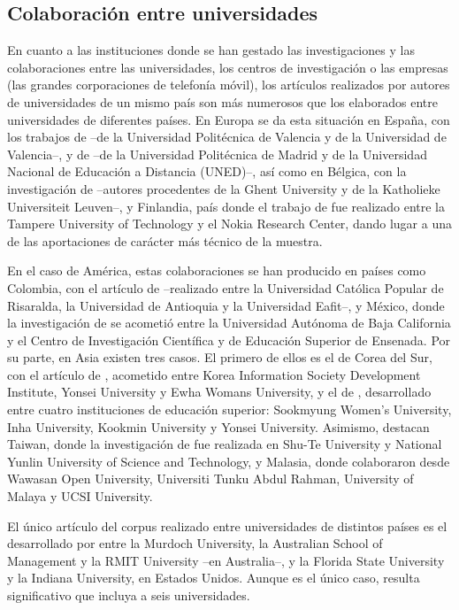 \documentclass[spanish]{textolivre}
\begin{document}
\subsection{Colaboración entre universidades}
En cuanto a las instituciones donde se han gestado las investigaciones y las colaboraciones entre las universidades, los centros de investigación o las empresas (las grandes corporaciones de telefonía móvil), los artículos realizados por autores de universidades de un mismo país son más numerosos que los elaborados entre universidades de diferentes países. En Europa se da esta situación en España, con los trabajos de \textcite{adelantadomateu2011} –de la Universidad Politécnica de Valencia y de la Universidad de Valencia–, y de \textcite{feijoo2010} –de la Universidad Politécnica de Madrid y de la Universidad Nacional de Educación a Distancia (UNED)–, así como en Bélgica, con la investigación de \textcite{evens2011} –autores procedentes de la Ghent University y de la Katholieke Universiteit Leuven–, y Finlandia, país donde el trabajo de \textcite{jumiskopyykko2008} fue realizado entre la Tampere University of Technology y el Nokia Research Center, dando lugar a una de las aportaciones de carácter más técnico de la muestra. 

En el caso de América, estas colaboraciones se han producido en países como Colombia, con el artículo de \textcite{montoyabermudez2016} –realizado entre la Universidad Católica Popular de Risaralda, la Universidad de Antioquia y la Universidad Eafit–, y México, donde la investigación de \textcite{tamayofernandez2011} se acometió entre la Universidad Autónoma de Baja California y el Centro de Investigación Científica y de Educación Superior de Ensenada. Por su parte, en Asia existen tres casos. El primero de ellos es el de Corea del Sur, con el artículo de \textcite{shim2017}, acometido entre Korea Information Society Development Institute, Yonsei University y Ewha Womans University, y el de \textcite{do2009}, desarrollado entre cuatro instituciones de educación superior: Sookmyung Women’s University, Inha University, Kookmin University y Yonsei University. Asimismo, destacan Taiwan, donde la investigación de \textcite{su2015} fue realizada en Shu-Te University y National Yunlin University of Science and Technology, y Malasia, donde \textcite{wong2016} colaboraron desde Wawasan Open University, Universiti Tunku Abdul Rahman, University of Malaya y UCSI University. 

El único artículo del corpus realizado entre universidades de distintos países es el desarrollado por \textcite{varan2013} entre la Murdoch University, la Australian School of Management y la RMIT University –en Australia–, y la Florida State University y la Indiana University, en Estados Unidos. Aunque es el único caso, resulta significativo que incluya a seis universidades. 
\end{document}
